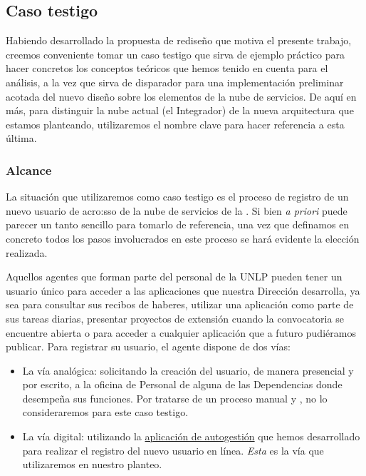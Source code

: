 \subsection{Caso testigo}
\label{caso-testigo}

Habiendo desarrollado la propuesta de rediseño que motiva el presente trabajo, creemos conveniente tomar un caso testigo que sirva de ejemplo práctico para hacer concretos los conceptos teóricos que hemos tenido en cuenta para el análisis, a la vez que sirva de disparador para una implementación preliminar acotada del nuevo diseño sobre los elementos de la nube de servicios. De aquí en más, para distinguir la nube actual (el Integrador) de la nueva arquitectura que estamos planteando, utilizaremos el nombre clave \textit{\cloud} para hacer referencia a esta última.

\subsubsection{Alcance}

La situación que utilizaremos como caso testigo es el proceso de registro de un nuevo usuario de \gls{acro:sso} de la nube de servicios de la {\unlp}. Si bien \textit{a priori} puede parecer un tanto sencillo para tomarlo de referencia, una vez que definamos en concreto todos los pasos involucrados en este proceso se hará evidente la elección realizada.

Aquellos agentes que forman parte del personal de la UNLP pueden tener un usuario único para acceder a las aplicaciones que nuestra Dirección desarrolla, ya sea para consultar sus recibos de haberes, utilizar una aplicación como parte de sus tareas diarias, presentar proyectos de extensión cuando la convocatoria se encuentre abierta o para acceder a cualquier aplicación que a futuro pudiéramos publicar. Para registrar su usuario, el agente dispone de dos vías:

\begin{itemize}
  \item La vía analógica: solicitando la creación del usuario, de manera presencial y por escrito, a la oficina de Personal de alguna de las Dependencias donde desempeña sus funciones. Por tratarse de un proceso manual y , no lo consideraremos para este caso testigo.

  \item La vía digital: utilizando la \hyperref[anexo:detalle-clientes:sso]{aplicación de autogestión} que hemos desarrollado para realizar el registro del nuevo usuario en línea. \textit{Esta} es la vía que utilizaremos en nuestro planteo.
\end{itemize}

